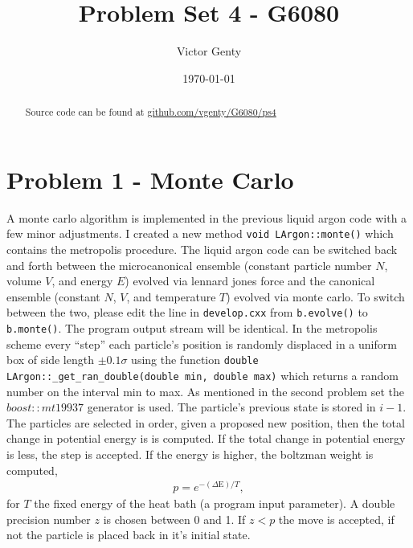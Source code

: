 \documentclass[singlepage,notitlepage,nofootinbib,11pt]{revtex4-1}
\newcommand{\eq}[1]{\begin{align*}#1\end{align*}}
\begin{document}
\title{Problem Set 4 - G6080}
\author{Victor Genty}
\date{\today}
\begin{abstract}
\centering
Source code can be found at \href{https://github.com/vgenty/G6080/tree/master/ps4}{github.com/vgenty/G6080/ps4}
\end{abstract}
\maketitle
\section{Problem 1 - Monte Carlo}
A monte carlo algorithm is implemented in the previous liquid argon code with a few minor adjustments. I created a new method \verb|void LArgon::monte()| which contains the metropolis procedure. The liquid argon code can be switched back and forth between the microcanonical ensemble (constant particle number $N$, volume $V$, and energy $E$) evolved via lennard jones force and the canonical ensemble (constant $N$, $V$, and temperature $T$) evolved via monte carlo. To switch between the two, please edit the line in \verb|develop.cxx| from \verb|b.evolve()| to \verb|b.monte()|. The program output stream will be identical. In the metropolis scheme every ``step'' each particle's position is randomly displaced in a uniform box of side length $\pm 0.1\sigma$ using the function \verb|double LArgon::_get_ran_double(double min, double max)| which returns a random number on the interval min to max. As mentioned in the second problem set the $boost::mt19937$ generator is used. The particle's previous state is stored in $i-1$. The particles are selected in order, given a proposed new position, then the total change in potential energy is is computed. If the total change in potential energy is less, the step is accepted. If the energy is higher, the boltzman weight is computed,
\eq{
  p = e^{-(\Delta\text{E})/T},
}
for $T$ the fixed energy of the heat bath (a program input parameter). A double precision number $z$ is chosen between 0 and 1. If $z < p$ the move is accepted, if not the particle is placed back in it's initial state.
\end{document}
